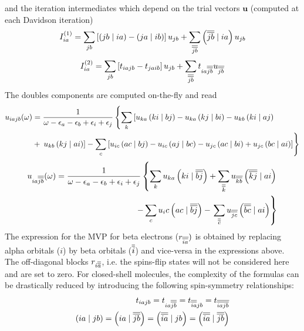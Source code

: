 \noindent and the iteration intermediates which depend on the trial vectors $\mathbf{u}$ (computed at each Davidson iteration)
\begin{equation}
I_{ia}^{(1)} = \sum_{jb} \left[ \left( jb \mid ia \right) - \left( ja \mid ib \right) \right] u_{jb} + \sum_{\overline{\overline{jb}}} \left( \overline{\overline{jb}} \mid ia \right) u_{jb}
\end{equation}
\begin{equation}
I_{ia}^{(2)} = \sum_{jb} \left[ t_{iajb} - t_{jaib} \right] u_{jb} + \sum_{\overline{\overline{jb}}} t_{ia\overline{\overline{jb}}} u_{\overline{\overline{jb}}}
\end{equation}
\noindent The doubles components are computed on-the-fly and read
\begin{equation}
\begin{split}
u_{iajb}(\omega) &= \frac{1}{\omega - \epsilon_a - \epsilon_b + \epsilon_i + \epsilon_j} \left\lbrace \sum_k \left[ u_{ka} \left( ki \mid bj \right) - u_{ka} \left( kj \mid bi \right) - u_{kb} \left( ki \mid aj \right) \right. \right. \\
&+ \left. \left. u_{kb} \left( kj \mid ai \right) \right] - \sum_c \left[ u_{ic} \left( ac \mid bj \right) - u_{ic} \left( aj \mid bc \right) - u_{jc} \left( ac \mid bi \right) + u_{jc} \left( bc \mid ai \right) \right] \right\rbrace
\end{split}
\end{equation}
\begin{equation}
\begin{split}
u_{ia\overline{\overline{jb}}}(\omega) = \frac{1}{\omega - \epsilon_a - \epsilon_b + \epsilon_i + \epsilon_j} \left\lbrace \sum_k u_{ka} \left( ki \mid \overline{\overline{bj}} \right) + \sum_{\overline{\overline{k}}} u_{\overline{\overline{kb}}} \left( \overline{\overline{kj}} \mid ai \right) \right. \\ - \sum_c u_ic \left( ac \mid \overline{\overline{bj}} \right) - \left. \sum_{\overline{\overline{c}}} u_{\overline{\overline{jc}}} \left( \overline{\overline{bc}} \mid ai \right) \right\rbrace
\end{split}
\end{equation}
\noindent The expression for the MVP for beta electrons ($r_{\overline{\overline{ia}}})$ is obtained by replacing alpha orbitals ($i$) by beta orbitals ($\overline{\overline{i}}$) and vice-versa in the expressions above. The off-diagonal blocks $r_{i\overline{\overline{a}}}$, i.e. the spins-flip states will not be considered here and are set to zero. For closed-shell molecules, the complexity of the formulas can be drastically reduced by introducing the following spin-symmetry relationships:
\begin{equation}
\begin{split}
t_{iajb} = t_{ia\overline{\overline{jb}}} = t_{\overline{\overline{ia}}jb} = t_{\overline{\overline{iajb}}} \\
\left( ia \mid jb \right) = \left( ia \mid \overline{\overline{jb}} \right) = \left( \overline{\overline{ia}} \mid jb \right) = \left( \overline{\overline{ia}} \mid \overline{\overline{jb}} \right) 
\end{split}
\end{equation}
